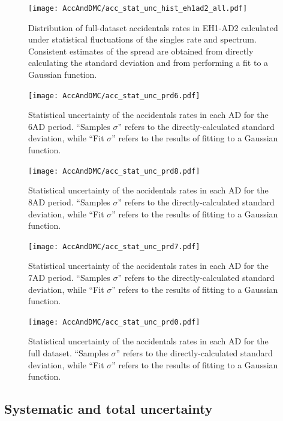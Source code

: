 \documentclass[../thesis.tex]{subfiles}
\begin{document}
\begin{figure}[ht]
  \texttt{[image: AccAndDMC/acc\_stat\_unc\_hist\_eh1ad2\_all.pdf]}
  \caption{Distribution of full-dataset accidentals rates in EH1-AD2 calculated under statistical fluctuations of the singles rate and spectrum. Consistent estimates of the spread are obtained from directly calculating the standard deviation and from performing a fit to a Gaussian function.}
  \label{fig:acc_stat_unc_hist}
\end{figure}

\begin{figure}[ht]
\texttt{[image: AccAndDMC/acc\_stat\_unc\_prd6.pdf]}
\caption{Statistical uncertainty of the accidentals rates in each AD for the 6AD period. ``Samples $\sigma$'' refers to the directly-calculated standard deviation, while ``Fit $\sigma$'' refers to the results of fitting to a Gaussian function.}
\label{fig:acc_stat_unc_prd6}
\end{figure}

\begin{figure}[ht]
\texttt{[image: AccAndDMC/acc\_stat\_unc\_prd8.pdf]}
\caption{Statistical uncertainty of the accidentals rates in each AD for the 8AD period. ``Samples $\sigma$'' refers to the directly-calculated standard deviation, while ``Fit $\sigma$'' refers to the results of fitting to a Gaussian function.}
\label{fig:acc_stat_unc_prd8}
\end{figure}

\begin{figure}[ht]
\texttt{[image: AccAndDMC/acc\_stat\_unc\_prd7.pdf]}
\caption{Statistical uncertainty of the accidentals rates in each AD for the 7AD period. ``Samples $\sigma$'' refers to the directly-calculated standard deviation, while ``Fit $\sigma$'' refers to the results of fitting to a Gaussian function.}
\label{fig:acc_stat_unc_prd7}
\end{figure}

\begin{figure}[ht]
  \texttt{[image: AccAndDMC/acc\_stat\_unc\_prd0.pdf]}
  \caption{Statistical uncertainty of the accidentals rates in each AD for the full dataset. ``Samples $\sigma$'' refers to the directly-calculated standard deviation, while ``Fit $\sigma$'' refers to the results of fitting to a Gaussian function.}
  \label{fig:acc_stat_unc_prd0}
\end{figure}

\subsection{Systematic and total uncertainty}
\label{sec:accSystUnc}
\end{document}
